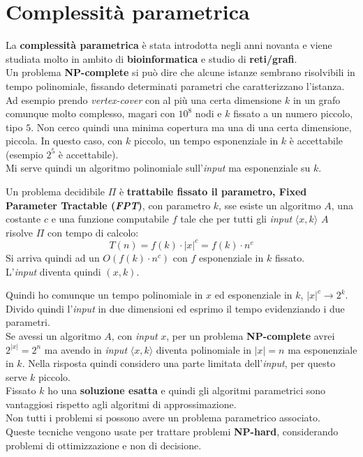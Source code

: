 \section{Complessità parametrica}
La \textbf{complessità parametrica} è stata introdotta negli anni novanta e
viene studiata molto in ambito di \textbf{bioinformatica} e studio di
\textbf{reti/grafi}.\\
Un problema \textbf{NP-complete} si può dire che alcune istanze sembrano
risolvibili in tempo polinomiale, fissando determinati parametri che
caratterizzano l'istanza. Ad esempio prendo \textit{vertex-cover} con al più una
certa dimensione $k$ in un grafo comunque molto complesso, magari con $10^8$
nodi e $k$ fissato a un numero piccolo, tipo $5$. Non cerco quindi una minima
copertura ma una di una certa dimensione, piccola. In questo caso, con $k$
piccolo, un tempo esponenziale in $k$ è accettabile (esempio $2^5$ è
accettabile).\\
Mi serve quindi un algoritmo polinomiale sull'\textit{input} ma esponenziale su $k$.
\begin{definizione}
  Un problema decidibile $\Pi$ è \textbf{trattabile fissato il parametro, Fixed
    Parameter Tractable (\textit{FPT})}, con parametro $k$, sse esiste un
  algoritmo $A$, una costante $c$ e una funzione computabile $f$ tale che per
  tutti gli \textit{input} $\langle x,k\rangle$ $A$ risolve $\Pi$ con tempo di calcolo:
  \[T(n) = f(k)\cdot|x|^c=f(k)\cdot n^c\]
  Si arriva quindi ad un $O(f(k)\cdot n^c)$ con $f$ esponenziale in $k$
  fissato. \\
  L'\textit{input} diventa quindi $(x,k)$.
\end{definizione}
Quindi ho comunque un tempo polinomiale in $x$ ed esponenziale in $k$, $|x|^c\to
2^k$. Divido quindi l'\textit{input} in due dimensioni ed esprimo il tempo evidenziando
i due parametri.\\
Se avessi un algoritmo $A$, con \textit{input} $x$, per un problema \textbf{NP-complete}
avrei $2^{|x|}=2^n$ ma avendo in \textit{input} $\langle x,k\rangle$ diventa polinomiale
in $|x|=n$ ma esponenziale in $k$. Nella risposta quindi considero una parte
limitata dell'\textit{input}, per questo serve $k$ piccolo.\\
Fissato $k$ ho una \textbf{soluzione esatta} e quindi gli algoritmi parametrici
sono vantaggiosi rispetto agli algoritmi di approssimazione.\\
Non tutti i problemi si possono avere un problema parametrico associato.\\
Queste tecniche vengono usate per trattare problemi \textbf{NP-hard},
considerando problemi di ottimizzazione e non di decisione.
